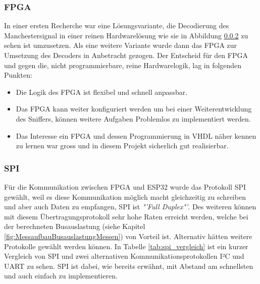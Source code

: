 \subsubsection{FPGA}
In einer ersten Recherche war eine Lösungsvariante, die Decodierung des Manchestersignal in einer reinen Hardwarelösung wie sie in Abbildung \ref{} zu sehen ist umzusetzen. Als eine weitere Variante wurde dann das FPGA zur Umsetzung des Decoders in Anbetracht gezogen.
Der Entscheid für den FPGA und gegen die, nicht programmierbare, reine Hardwarelogik, lag in folgenden Punkten:
\begin{itemize}
  \item Die Logik des FPGA ist flexibel und schnell anpassbar.
  \item Das FPGA kann weiter konfiguriert werden um bei einer Weiterentwicklung des Sniffers, können weitere Aufgaben Problemlos zu implementiert werden.
  \item Das Interesse ein FPGA und dessen Programmierung in VHDL näher kennen zu lernen war gross und in diesem Projekt sicherlich gut realisierbar.
\end{itemize}

\newpage
\subsubsection{SPI}
Für die Kommunikation zwischen FPGA und ESP32 wurde das Protokoll SPI gewählt, weil es diese Kommunikation möglich macht gleichzeitig zu schreiben und aber auch Daten zu empfangen, SPI ist \textit{"'Full Duplex"'}. Des weiteren können mit diesem Übertragungsprotokoll sehr hohe Raten erreicht werden, welche bei der berechneten Busauslastung (siehe Kapitel \ref{fig:MessaufbauBusauslastungMessen}) von Vorteil ist. Alternativ hätten weitere Protokolle gewählt werden können. In Tabelle \ref{tab:spi_vergleich} ist ein kurzer Vergleich von SPI und zwei alternativen Kommunikationsprotokollen I²C und UART zu sehen. SPI ist dabei, wie bereits erwähnt, mit Abstand am schnellsten und auch einfach zu implementieren.

